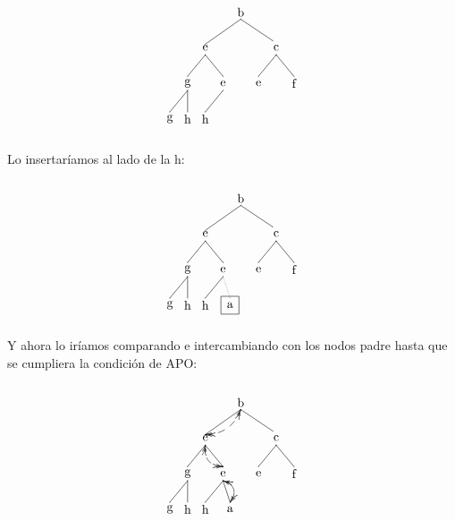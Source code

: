 \documentclass[10pt,a4paper,spanish]{report}
\begin{document}
\[\begin{xy}
,(0,0)*+=<10mm>[]\txt<2cm>{b}
,(-10,-10)*+=<10mm>[]\txt<2cm>{e}
,(10,-10)*+=<10mm>[]\txt<2cm>{c}
,(-15,-20)*+=<10mm>[]\txt<2cm>{g}
,(-5,-20)*+=<10mm>[]\txt<2cm>{e}
,(5,-20)*+=<10mm>[]\txt<2cm>{e}
,(15,-20)*+=<10mm>[]\txt<2cm>{f}
,(-20,-30)*+=<10mm>[]\txt<2cm>{g}
,(-15,-30)*+=<10mm>[]\txt<2cm>{h}
,(-10,-30)*+=<10mm>[]\txt<2cm>{h}

\ar@{-} (0,-2);(-10,-9)
\ar@{-} (0,-2);(9,-8)
\ar@{-} (-10,-12);(-15,-18)
\ar@{-} (10,-12);(5,-18)
\ar@{-} (10,-12);(15,-18)
\ar@{-} (-15,-22);(-20,-28)
\ar@{-} (-15,-22);(-15,-28)
\ar@{-} (-10,-12);(-5,-18)
\ar@{-} (-5,-22);(-10,-28)
\end{xy}\]

\noindent
Lo insertaríamos al lado de la h:

\[\begin{xy}
,(0,0)*+=<10mm>[]\txt<2cm>{b}
,(-10,-10)*+=<10mm>[]\txt<2cm>{e}
,(10,-10)*+=<10mm>[]\txt<2cm>{c}
,(-15,-20)*+=<10mm>[]\txt<2cm>{g}
,(-5,-20)*+=<10mm>[]\txt<2cm>{e}
,(5,-20)*+=<10mm>[]\txt<2cm>{e}
,(15,-20)*+=<10mm>[]\txt<2cm>{f}
,(-20,-30)*+=<10mm>[]\txt<2cm>{g}
,(-15,-30)*+=<10mm>[]\txt<2cm>{h}
,(-10,-30)*+=<10mm>[]\txt<2cm>{h}
,(-3,-30)*+=<5mm>[F]\txt<0.5cm>{a}

\ar@{-} (0,-2);(-10,-9)
\ar@{-} (0,-2);(9,-8)
\ar@{-} (-10,-12);(-15,-18)
\ar@{-} (10,-12);(5,-18)
\ar@{-} (10,-12);(15,-18)
\ar@{-} (-15,-22);(-20,-28)
\ar@{-} (-15,-22);(-15,-28)
\ar@{-} (-10,-12);(-5,-18)
\ar@{-} (-5,-22);(-10,-28)
\ar@{.} (-5,-22);(-3,-28)
\end{xy}\]

\noindent
Y ahora lo iríamos comparando e intercambiando con los nodos padre hasta que se cumpliera la condición de APO:

\[\begin{xy}
,(0,0)*+=<10mm>[]\txt<2cm>{b}
,(-10,-10)*+=<10mm>[]\txt<2cm>{e}
,(10,-10)*+=<10mm>[]\txt<2cm>{c}
,(-15,-20)*+=<10mm>[]\txt<2cm>{g}
,(-5,-20)*+=<10mm>[]\txt<2cm>{e}
,(5,-20)*+=<10mm>[]\txt<2cm>{e}
,(15,-20)*+=<10mm>[]\txt<2cm>{f}
,(-20,-30)*+=<10mm>[]\txt<2cm>{g}
,(-15,-30)*+=<10mm>[]\txt<2cm>{h}
,(-10,-30)*+=<10mm>[]\txt<2cm>{h}
,(-3,-30)*+=<5mm>[]\txt<0.5cm>{a}

\ar@{-} (0,-2);(-10,-9)
\ar@{-} (0,-2);(9,-8)
\ar@/^/@{<<-->>}(0,-2);(-10,-9)
\ar@{-} (-10,-12);(-15,-18)
\ar@{-} (10,-12);(5,-18)
\ar@{-} (10,-12);(15,-18)
\ar@/_/@{<<-->>} (-10,-12);(-5,-18)
\ar@{-} (-15,-22);(-20,-28)
\ar@{-} (-15,-22);(-15,-28)
\ar@{-} (-10,-12);(-5,-18)
\ar@{-} (-5,-22);(-10,-28)
\ar@{-} (-5,-22);(-3,-28)
\ar@/^/@{<<-->>} (-5,-22);(-3,-28)
\end{xy}\]
\end{document}
